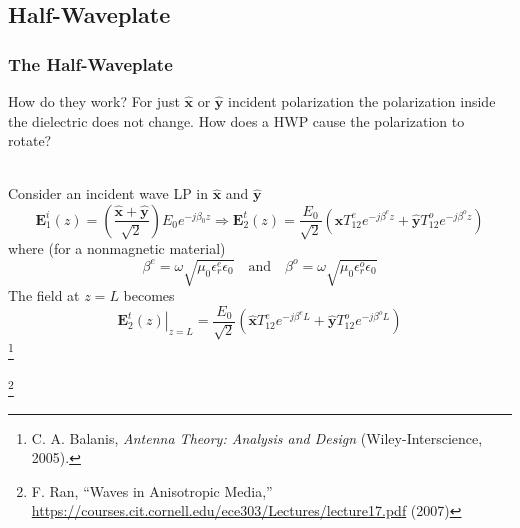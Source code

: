 \documentclass[aspectratio=169,t,xcolor=table]{beamer}
\newcommand{\bv}[1]{\mathbf{#1}}
\newcommand{\vecc}[1]{\mathbf{#1}}
\newcommand\blfootnote[1]{%
  \begingroup
  \renewcommand\thefootnote{}\footnote[frame]{\tiny #1}%
  \addtocounter{footnote}{-1}%
  \endgroup
}
\begin{document}
\subsection{Half-Waveplate}
\begin{frame}
\frametitle{The Half-Waveplate}\vspace{-1em}
\begin{alertblock}{How do they work?}
    For just $\bv{\hat{x}}$ or $\bv{\hat{y}}$ incident polarization the 
    polarization inside the dielectric does 
    not change. How does a HWP cause the polarization to rotate?
\end{alertblock}\\\vspace{1em}\pause
Consider an incident wave \color{red}LP in $\bv{\hat{x}}$ and 
$\bv{\hat{y}}$\color{black}~\cite{Balanis-2012,Wav_anis}
\begin{equation}\label{eq:In_HWP}
    \vecc{E}^i_1(z) = 
    \left(\frac{\bv{\hat{x}} + \bv{\hat{y}}}{\sqrt{2}}\right)E_0 e^{-j\beta_0 z}
    \Rightarrow
    \vecc{E}^t_2(z) = 
    \frac{E_0}{\sqrt{2}}\left(
        \bv{\hat{x}}T_{12}^{e} e^{-j\beta^e z} +
        \bv{\hat{y}}T_{12}^{o} e^{-j\beta^o z}
    \right)
\end{equation}\pause
where (for a nonmagnetic material)
\begin{equation}
\beta^e = \omega\sqrt{\mu_0\epsilon^e_r\epsilon_0}
\quad\text{and}\quad
\beta^o = \omega\sqrt{\mu_0\epsilon^o_r\epsilon_0}
\end{equation}\pause
The field at $z=L$ becomes
\begin{equation}\label{eq:In_HWP_at_L}
    \left.\vecc{E}^t_2(z) \right|_{z = L}= 
    \frac{E_0}{\sqrt{2}}\left(
        \bv{\hat{x}}T_{12}^{e} e^{-j\beta^e L} +
        \bv{\hat{y}}T_{12}^{o} e^{-j\beta^o L}
    \right)
\end{equation}
\blfootnote{
    \cite{Balanis-2012} C. A. Balanis, \textit{Antenna Theory: 
    Analysis and Design}
    (Wiley-Interscience, 2005).
}
\blfootnote{
        \cite{Wav_anis} F. Ran, ``Waves in Anisotropic Media,''
        \url{https://courses.cit.cornell.edu/ece303/Lectures/lecture17.pdf} (2007)
    }
\end{frame}
\end{document}
